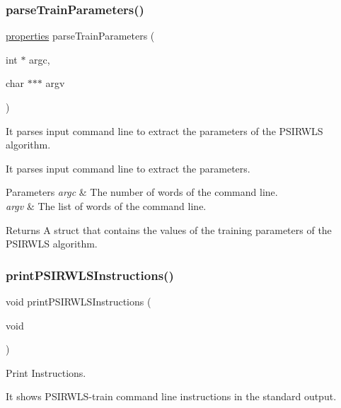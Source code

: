 \subsubsection{\texorpdfstring{parse\+Train\+Parameters()}{parseTrainParameters()}}
{\ttfamily \hyperlink{structproperties}{properties} parse\+Train\+Parameters (\begin{DoxyParamCaption}\item[{int $\ast$}]{argc,  }\item[{char $\ast$$\ast$$\ast$}]{argv }\end{DoxyParamCaption})}



It parses input command line to extract the parameters of the P\+S\+I\+R\+W\+LS algorithm. 

It parses input command line to extract the parameters. 
\begin{DoxyParams}{Parameters}
{\em argc} & The number of words of the command line. \\
\hline
{\em argv} & The list of words of the command line. \\
\hline
\end{DoxyParams}
\begin{DoxyReturn}{Returns}
A struct that contains the values of the training parameters of the P\+S\+I\+R\+W\+LS algorithm. 
\end{DoxyReturn}
\hypertarget{PSIRWLS-train_8h_a0a24887780df491bc4ea2f590a2198f7}{}\label{PSIRWLS-train_8h_a0a24887780df491bc4ea2f590a2198f7} 
\subsubsection{\texorpdfstring{print\+P\+S\+I\+R\+W\+L\+S\+Instructions()}{printPSIRWLSInstructions()}}
{\ttfamily void print\+P\+S\+I\+R\+W\+L\+S\+Instructions (\begin{DoxyParamCaption}\item[{void}]{ }\end{DoxyParamCaption})}



Print Instructions. 

It shows P\+S\+I\+R\+W\+L\+S-\/train command line instructions in the standard output. \hypertarget{PSIRWLS-train_8h_aa6c8aa8b86b7a0647cc679408c310cd3}{}\label{PSIRWLS-train_8h_aa6c8aa8b86b7a0647cc679408c310cd3} 
